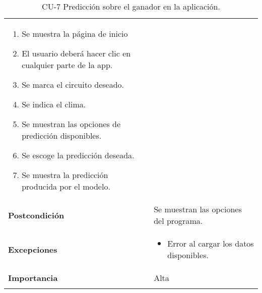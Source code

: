 \begin{longtable}[h!]{@{}ll@{}}
\begin{minipage}[t]{0.71\columnwidth}
\begin{enumerate}
\def\labelenumi{\arabic{enumi}.}
\tightlist
\item 
  Se muestra la página de inicio
\item
  El usuario deberá hacer clic en cualquier parte de la app.
\item
  Se marca el circuito deseado.
\item
  Se indica el clima.
\item
  Se muestran las opciones de predicción disponibles.
\item
  Se escoge la predicción deseada.
\item
  Se muestra la predicción producida por el modelo.
\end{enumerate}\strut
\end{minipage}\tabularnewline
\begin{minipage}[t]{0.23\columnwidth}\raggedright\strut
\textbf{Postcondición}\strut
\end{minipage} & \begin{minipage}[t]{0.71\columnwidth}\raggedright\strut
Se muestran las opciones del programa.\strut
\end{minipage}\tabularnewline
\begin{minipage}[t]{0.23\columnwidth}\raggedright\strut
\textbf{Excepciones}\strut
\end{minipage} & \begin{minipage}[t]{0.71\columnwidth}\raggedright\strut
\begin{itemize}
\tightlist
\item
  Error al cargar los datos disponibles.
\end{itemize}\strut
\end{minipage}\tabularnewline
\begin{minipage}[t]{0.23\columnwidth}\raggedright\strut
\textbf{Importancia}\strut
\end{minipage} & \begin{minipage}[t]{0.71\columnwidth}\raggedright\strut
Alta\strut
\end{minipage}\tabularnewline
\bottomrule
\caption{CU-7 Predicción sobre el ganador en la aplicación.}
\end{longtable}


